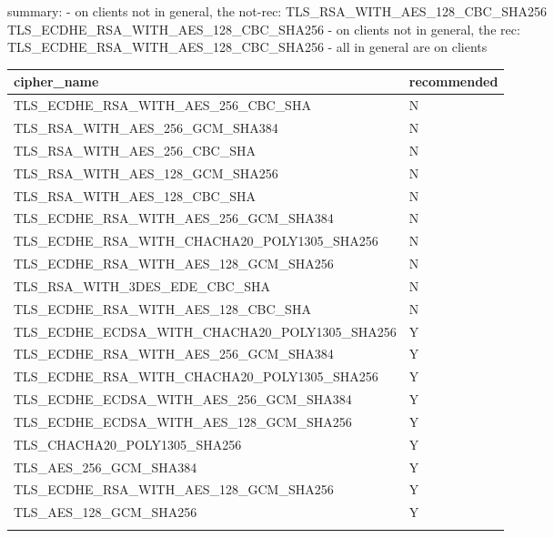 \iffalse
summary:
- on clients not in general, the not-rec:
TLS\_RSA\_WITH\_AES\_128\_CBC\_SHA256
TLS\_ECDHE\_RSA\_WITH\_AES\_128\_CBC\_SHA256
- on clients not in general, the rec:
TLS\_ECDHE\_RSA\_WITH\_AES\_128\_CBC\_SHA256
- all in general are on clients

\begin{tabular}{ll}
\toprule
cipher\_name & recommended \\
\midrule
TLS\_ECDHE\_RSA\_WITH\_AES\_256\_CBC\_SHA & N \\
TLS\_RSA\_WITH\_AES\_256\_GCM\_SHA384 & N \\
TLS\_RSA\_WITH\_AES\_256\_CBC\_SHA & N \\
TLS\_RSA\_WITH\_AES\_128\_GCM\_SHA256 & N \\
TLS\_RSA\_WITH\_AES\_128\_CBC\_SHA & N \\
TLS\_ECDHE\_RSA\_WITH\_AES\_256\_GCM\_SHA384 & N \\
TLS\_ECDHE\_RSA\_WITH\_CHACHA20\_POLY1305\_SHA256 & N \\  %
TLS\_ECDHE\_RSA\_WITH\_AES\_128\_GCM\_SHA256 & N \\
TLS\_RSA\_WITH\_3DES\_EDE\_CBC\_SHA & N \\
TLS\_ECDHE\_RSA\_WITH\_AES\_128\_CBC\_SHA & N \\
TLS\_ECDHE\_ECDSA\_WITH\_CHACHA20\_POLY1305\_SHA256 & Y \\  %
TLS\_ECDHE\_RSA\_WITH\_AES\_256\_GCM\_SHA384 & Y \\
TLS\_ECDHE\_RSA\_WITH\_CHACHA20\_POLY1305\_SHA256 & Y \\ %
TLS\_ECDHE\_ECDSA\_WITH\_AES\_256\_GCM\_SHA384 & Y \\
TLS\_ECDHE\_ECDSA\_WITH\_AES\_128\_GCM\_SHA256 & Y \\
TLS\_CHACHA20\_POLY1305\_SHA256 & Y \\
TLS\_AES\_256\_GCM\_SHA384 & Y \\
TLS\_ECDHE\_RSA\_WITH\_AES\_128\_GCM\_SHA256 & Y \\
TLS\_AES\_128\_GCM\_SHA256 & Y \\
\bottomrule
\label{tab:aggr_all_rec_ciphers}
\caption{Aggregation of all 6 datasets, with unique ciphername, recommendation}
\end{tabular}

